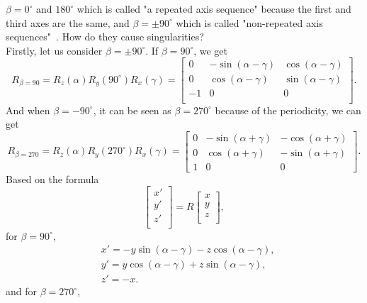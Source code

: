 $\beta=0^{\circ}$ and $180^{\circ}$ which is called "a repeated axis sequence" because the first and third axes are the same, and $\beta=\pm90^{\circ}$ which is called "non-repeated axis sequences"~\cite{r17,r19}. How do they cause singularities? 
\\Firstly, let us consider $\beta=\pm90^{\circ}$. If $\beta=90^{\circ}$, we get 
\begin{equation}
R_{\beta=90}=R_{z}(\alpha)R_{y}(90^{\circ})R_{x}(\gamma)=
\begin{bmatrix}
0&-\sin(\alpha-\gamma)&\cos(\alpha-\gamma)\\
0&\cos(\alpha-\gamma)&\sin(\alpha-\gamma)\\
         -1&                              0&0\\
\end{bmatrix}.
\end{equation}
And when $\beta=-90^{\circ}$, it can be seen as $\beta=270^{\circ}$ because of the periodicity, we can get 
\begin{equation}
R_{\beta=270}=R_{z}(\alpha)R_{y}(270^{\circ})R_{x}(\gamma)=
\begin{bmatrix}
0&-\sin(\alpha+\gamma)&-\cos(\alpha+\gamma)\\
0&\cos(\alpha+\gamma)&-\sin(\alpha+\gamma)\\
1&                               0&0
\end{bmatrix}.
\end{equation}
Based on the formula
\begin{equation}
\begin{bmatrix}
x'\\
y'\\
z'\\
\end{bmatrix}
=R
\begin{bmatrix}
x\\
y\\
z\\
\end{bmatrix},
\end{equation}
for $\beta=90^{\circ}$,
\begin{equation}
\label{equation:beta=90}
\begin{aligned}
&x'=-y\sin(\alpha-\gamma)-z\cos(\alpha-\gamma), \\
&y'=y\cos(\alpha-\gamma)+z\sin(\alpha-\gamma), \\
&z'=-x. 
\end{aligned}
\end{equation}
and for $\beta=270^{\circ}$, 
